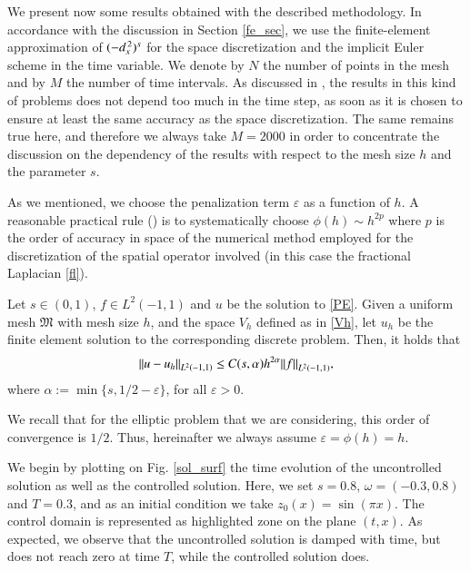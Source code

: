 We present now some results obtained with the described methodology. In accordance with the discussion in Section \ref{fe_sec}, we use the finite-element approximation of $(-d_x^{\,2})^{s}$ for the space discretization and the implicit Euler scheme in the time variable. We denote by $N$ the number of points in the mesh and by $M$ the number of time intervals. As discussed in \cite{boyer2011uniform}, the results in this kind of problems does not depend too much in the time step, as soon as it is chosen to ensure at least the same accuracy as the space discretization. The same remains true here, and therefore we always take $M=2000$ in order to concentrate the discussion on the dependency of the results with respect to the mesh size $h$ and the parameter $s$.

As we mentioned, we choose the penalization term $\varepsilon$ as a function of $h$. A reasonable practical rule (\cite{boyer2013penalised}) is to systematically choose $\phi(h)\sim h^{2p}$ where $p$ is the order of accuracy in space of the numerical method employed for the discretization of the spatial operator involved (in this case the fractional Laplacian \eqref{fl}).

\begin{theorem}
Let $s\in(0,1)$, $f\in L^2(-1,1)$ and $u$ be the solution to \eqref{PE}. Given a uniform mesh $\mathfrak{M}$ with mesh size $h$,
and the space $V_h$ defined as in \eqref{Vh}, let $u_h$ be the finite element solution to the corresponding discrete 
problem. Then, it holds that
\begin{align}\label{error_l2}
	{\left\|u-u_h\right\|}_{L^2(-1,1)}\leq C(s,\alpha)h^{2\alpha}{\left\|f\right\|}_{L^2(-1,1)},
\end{align}
where $\alpha:=\min\{s, 1/2 -\varepsilon\}$, for all $\varepsilon>0$.
\end{theorem}%



 We recall that for the elliptic problem that we are considering, this order of convergence is $1/2$. Thus, hereinafter we always assume $\varepsilon=\phi(h)=h$.

We begin by plotting on Fig.  \ref{sol_surf} the time evolution of the uncontrolled solution as well as the controlled solution. Here, we set $s=0.8$, $\omega=(-0.3,0.8)$ and $T=0.3$, and as an initial condition we take $z_0(x) = \sin(\pi x)$. The control domain is represented as highlighted zone on the plane $(t,x)$. As expected, we observe that the uncontrolled solution is damped with time, but does not reach zero at time $T$, while the controlled solution does. 

